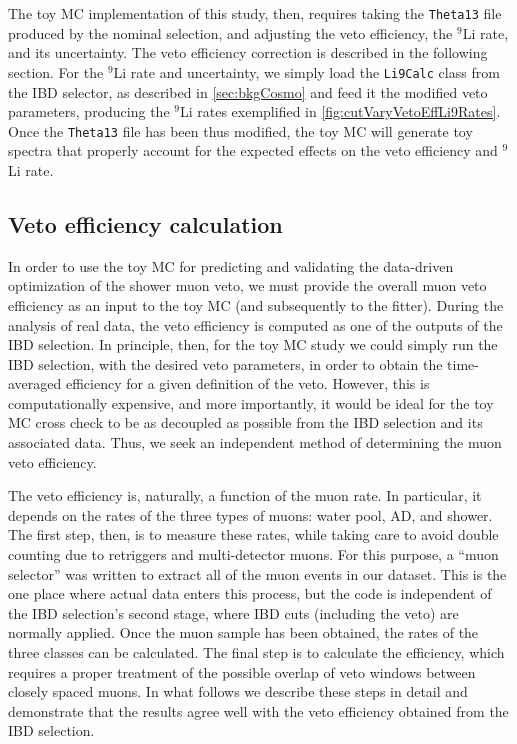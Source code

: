 \documentclass[../thesis.tex]{subfiles}
\begin{document}
The toy MC implementation of this study, then, requires taking the \texttt{Theta13} file produced by the nominal selection, and adjusting the veto efficiency, the $^9$Li rate, and its uncertainty. The veto efficiency correction is described in the following section. For the $^9$Li rate and uncertainty, we simply load the \texttt{Li9Calc} class from the IBD selector, as described in \autoref{sec:bkgCosmo} and feed it the modified veto parameters, producing the $^9$Li rates exemplified in \autoref{fig:cutVaryVetoEffLi9Rates}. Once the \texttt{Theta13} file has been thus modified, the toy MC will generate toy spectra that properly account for the expected effects on the veto efficiency and $^9$Li rate.

\subsection{Veto efficiency calculation}%
\label{sec:cutVaryMuVetoEff}

In order to use the toy MC for predicting and validating the data-driven optimization of the shower muon veto, we must provide the overall muon veto efficiency as an input to the toy MC (and subsequently to the fitter). During the analysis of real data, the veto efficiency is computed as one of the outputs of the IBD selection. In principle, then, for the toy MC study we could simply run the IBD selection, with the desired veto parameters, in order to obtain the time-averaged efficiency for a given definition of the veto. However, this is computationally expensive, and more importantly, it would be ideal for the toy MC cross check to be as decoupled as possible from the IBD selection and its associated data. Thus, we seek an independent method of determining the muon veto efficiency.

The veto efficiency is, naturally, a function of the muon rate. In particular, it depends on the rates of the three types of muons: water pool, AD, and shower. The first step, then, is to measure these rates, while taking care to avoid double counting due to retriggers and multi-detector muons. For this purpose, a ``muon selector'' was written to extract all of the muon events in our dataset. This is the one place where actual data enters this process, but the code is independent of the IBD selection's second stage, where IBD cuts (including the veto) are normally applied. Once the muon sample has been obtained, the rates of the three classes can be calculated. The final step is to calculate the efficiency, which requires a proper treatment of the possible overlap of veto windows between closely spaced muons. In what follows we describe these steps in detail and demonstrate that the results agree well with the veto efficiency obtained from the IBD selection.
\end{document}
